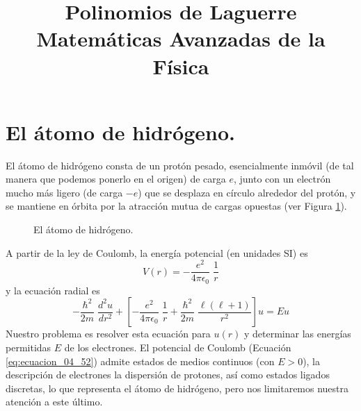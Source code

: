 
\usepackage{mathrsfs}
\usepackage{bigints}
\usepackage{standalone}
\newcommand{\saltosin}{\nonumber \\}
\newcommand{\dprima}[1]{#1^{\prime \prime}}
\newcommand{\prima}[1]{#1^{\prime}}
\newtheorem{teorema}{{\it Teorema}}[section]
\title{Polinomios de Laguerre \\ {\large Matemáticas Avanzadas de la Física}}
\date{ }

\maketitle
\fontsize{14}{14}\selectfont
\section{El átomo de hidrógeno.}
El átomo de hidrógeno consta de un protón pesado, esencialmente inmóvil (de tal manera que podemos ponerlo en el origen) de carga $e$, junto con un electrón mucho más ligero (de carga $-e$) que se desplaza en círculo alrededor del protón, y se mantiene en órbita por la atracción mutua de cargas opuestas (ver Figura \ref{fig:figura_01}).
\begin{figure}[H]
\centering

\caption{El átomo de hidrógeno.}
\label{fig:figura_01}
\end{figure}
A partir de la ley de Coulomb, la energía potencial (en unidades SI) es
\begin{equation}
V(r) = - \dfrac{e^{2}}{4 \pi \epsilon_{0}} \; \dfrac{1}{r}
\label{eq:ecuacion_04_52}
\end{equation}
y la ecuación radial es
\begin{equation}
- \dfrac{\hbar^{2}}{2m} \; \dfrac{d^{2} u }{d r^{2}} + \left[ - \dfrac{e^{2}}{4 \pi \epsilon_{0}} \; \dfrac{1}{r} + \dfrac{\hbar^{2}}{2m} \; \dfrac{\ell(\ell +1)}{r^{2}} \right] u =  E u
\label{eq:ecuacion_04_53}
\end{equation}
Nuestro problema es resolver esta ecuación para $u(r)$ y determinar las energías permitidas $E$ de los electrones. El potencial de Coulomb (Ecuación \ref{eq:ecuacion_04_52}) admite estados de medios continuos (con $E> 0$), la descripción de electrones la dispersión de protones, así como estados ligados discretas, lo que representa el átomo de hidrógeno, pero nos limitaremos nuestra atención a este último.
